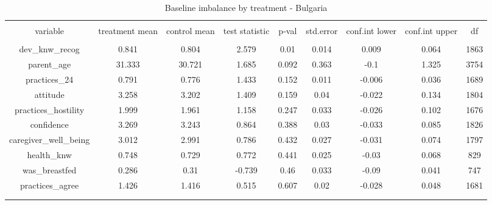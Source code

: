 
\begin{table}[!htbp] \centering 
  \caption{Baseline imbalance by treatment - Bulgaria} 
  \label{tbl:treatment_baseline_imbalance_bulgaria} 
\resizebox{\columnwidth}{!} {%
\begin{tabular}{@{\extracolsep{3pt}} ccccccccc} 
\\[-1.8ex]\hline 
\hline \\[-1.8ex] 
variable & treatment mean & control mean & test statistic & p-val & std.error & conf.int lower & conf.int upper & df \\ 
\hline \\[-1.8ex] 
dev\_knw\_recog & 0.841 & 0.804 & 2.579 & 0.01 & 0.014 & 0.009 & 0.064 & 1863 \\ 
parent\_age & 31.333 & 30.721 & 1.685 & 0.092 & 0.363 & -0.1 & 1.325 & 3754 \\ 
practices\_24 & 0.791 & 0.776 & 1.433 & 0.152 & 0.011 & -0.006 & 0.036 & 1689 \\ 
attitude & 3.258 & 3.202 & 1.409 & 0.159 & 0.04 & -0.022 & 0.134 & 1804 \\ 
practices\_hostility & 1.999 & 1.961 & 1.158 & 0.247 & 0.033 & -0.026 & 0.102 & 1676 \\ 
confidence & 3.269 & 3.243 & 0.864 & 0.388 & 0.03 & -0.033 & 0.085 & 1826 \\ 
caregiver\_well\_being & 3.012 & 2.991 & 0.786 & 0.432 & 0.027 & -0.031 & 0.074 & 1797 \\ 
health\_knw & 0.748 & 0.729 & 0.772 & 0.441 & 0.025 & -0.03 & 0.068 & 829 \\ 
was\_breastfed & 0.286 & 0.31 & -0.739 & 0.46 & 0.033 & -0.09 & 0.041 & 747 \\ 
practices\_agree & 1.426 & 1.416 & 0.515 & 0.607 & 0.02 & -0.028 & 0.048 & 1681 \\ 
 &  &  &  &  &  &  &  &  \\ 
\hline \\[-1.8ex] 
\end{tabular}%
}
\end{table} 
